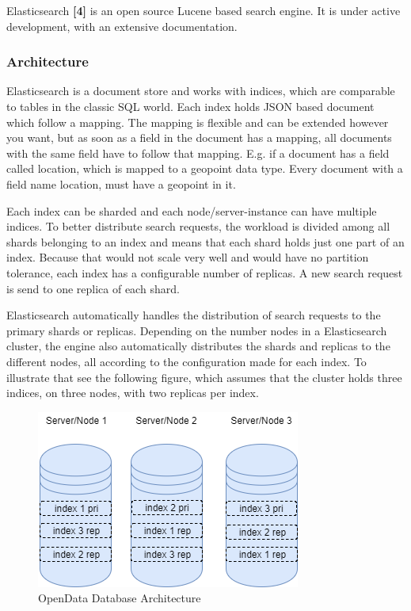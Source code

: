 Elasticsearch \textbf{{[}4{]}} is an open source Lucene based search
engine. It is under active development, with an extensive documentation.

\subsubsection{Architecture}\label{architecture}

Elasticsearch is a document store and works with indices, which are
comparable to tables in the classic SQL world. Each index holds JSON
based document which follow a mapping. The mapping is flexible and can
be extended however you want, but as soon as a field in the document has
a mapping, all documents with the same field have to follow that
mapping. E.g. if a document has a field called location, which is mapped
to a geopoint data type. Every document with a field name location, must
have a geopoint in it.

Each index can be sharded and each node/server-instance can have
multiple indices. To better distribute search requests, the workload is
divided among all shards belonging to an index and means that each shard
holds just one part of an index. Because that would not scale very well
and would have no partition tolerance, each index has a configurable
number of replicas. A new search request is send to one replica of each
shard.

Elasticsearch automatically handles the distribution of search requests
to the primary shards or replicas. Depending on the number nodes in a
Elasticsearch cluster, the engine also automatically distributes the
shards and replicas to the different nodes, all according to the
configuration made for each index. To illustrate that see the following
figure, which assumes that the cluster holds three indices, on three
nodes, with two replicas per index.

\begin{figure}[htbp]
\centering
\includegraphics{images/07_database_architecture_elastic.png}
\caption{OpenData Database Architecture}
\end{figure}

